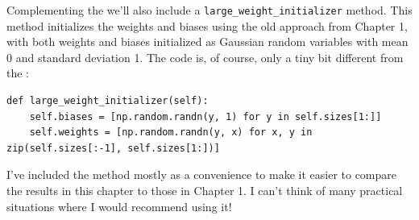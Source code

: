 \documentclass[a4paper,twoside,10pt]{book}
\begin{document}
Complementing the  we'll also include a \texttt{large\_weight\_initializer} method. This method initializes the weights and biases using the old approach from Chapter 1, with both weights and biases initialized as Gaussian random variables with mean 0 and standard deviation 1. The code is, of course, only a tiny bit different from the :
\begin{lstlisting}
def large_weight_initializer(self):
	self.biases = [np.random.randn(y, 1) for y in self.sizes[1:]]
	self.weights = [np.random.randn(y, x) for x, y in zip(self.sizes[:-1], self.sizes[1:])]
\end{lstlisting}
	
I've included the  method mostly as a convenience to make it easier to compare the results in this chapter to those in Chapter 1. I can't think of many practical situations where I would recommend using it!
\end{document}
